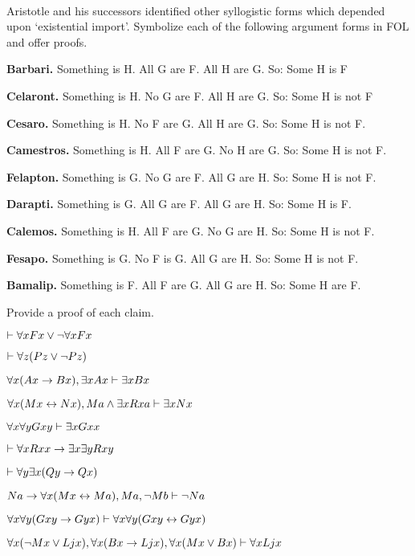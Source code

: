 \

\problempart
\label{pr.BarbaraEtc.proof2}
Aristotle and his successors identified other syllogistic forms which depended upon `existential import'. Symbolize each of the following argument forms in FOL and offer proofs.
\begin{ebullet}
	\item \textbf{Barbari.} Something is H. All G are F. All H are G. So: Some H is F
	\item \textbf{Celaront.} Something is H. No G are F. All H are G. So: Some H is not F
	\item \textbf{Cesaro.} Something is H. No F are G. All H are G. So: Some H is not F.
	\item \textbf{Camestros.} Something is H. All F are G. No H are G. So: Some H is not F.
	\item \textbf{Felapton.} Something is G. No G are F. All G are H. So: Some H is not F.
	\item \textbf{Darapti.} Something is G. All G are F. All G are H. So: Some H is F.
	\item \textbf{Calemos.} Something is H. All F are G. No G are H. So: Some H is not F.
	\item \textbf{Fesapo.} Something is G. No F is G. All G are H. So: Some H is not F.
	\item \textbf{Bamalip.} Something is F. All F are G. All G are H. So: Some H are F.
\end{ebullet}

\problempart
\label{pr.someFOLproofs}
Provide a proof of each claim.
\begin{earg}
\item $\vdash \forall x Fx \vee \neg \forall x Fx$
\item $\vdash\forall z (Pz \vee \neg Pz)$
\item $\forall x(Ax\rightarrow Bx), \exists x Ax \vdash \exists x Bx$
\item $\forall x(Mx \leftrightarrow Nx), Ma\wedge\exists x Rxa\vdash \exists x Nx$
\item $\forall x \forall y Gxy\vdash\exists x Gxx$
\item $\vdash\forall x Rxx\rightarrow \exists x \exists y Rxy$
\item $\vdash\forall y \exists x (Qy \rightarrow Qx)$
\item $Na \rightarrow \forall x(Mx \leftrightarrow Ma), Ma, \neg Mb\vdash \neg Na$
\item $\forall x \forall y (Gxy \rightarrow Gyx) \vdash \forall x\forall y (Gxy \leftrightarrow Gyx)$
\item $\forall x(\neg Mx \vee Ljx), \forall x(Bx\rightarrow Ljx), \forall x(Mx\vee Bx)\vdash \forall xLjx$
\end{earg}

